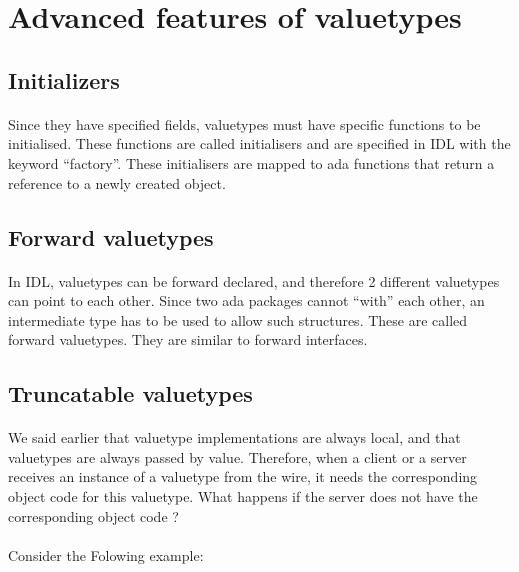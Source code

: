 \section{Advanced features of valuetypes}

\subsection{Initializers}
\paragraph{} Since they have specified fields, valuetypes must have
specific functions to be initialised. These functions are called
initialisers and are specified in IDL with the keyword
``factory''. These initialisers are mapped to ada functions that
return a reference to a newly created object.

\subsection{Forward valuetypes}
\paragraph{}In IDL, valuetypes can be forward declared, and therefore
2 different valuetypes can point to each other. Since two ada packages
cannot ``with'' each other, an intermediate type has to be used to
allow such structures. These are called forward valuetypes. They are
similar to forward interfaces.

\subsection{Truncatable valuetypes}
\paragraph{} We said earlier that valuetype implementations are always
local, and that valuetypes are always passed by value. Therefore, when
a client or a server receives an instance of a valuetype from the
wire, it needs the corresponding object code for this
valuetype. What happens if the server does not have the corresponding
object code ?

\paragraph{}
Consider the Folowing example:

